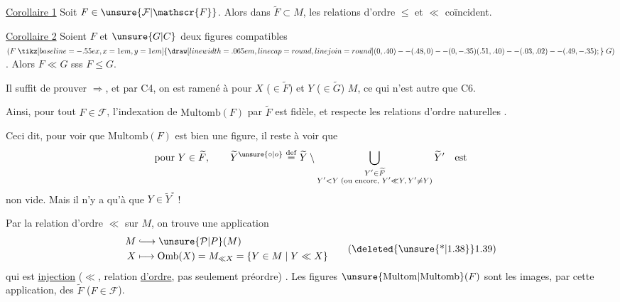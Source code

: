 
\uline{Corollaire 1} Soit $F\in\unsure{\mathcal{F}|\mathscr{F}}$. Alors dans $\widetilde F\subset M$, les relations d'ordre $\leq$ et $\ll$ coïncident.

\uline{Corollaire 2} Soient $F$ et $\unsure{G|C}$ deux figures compatibles $(F \mathrel{\tikz[baseline=-.55ex,x=1em,y=1em]{\draw[line width=.065em,line cap=round,line join=round] (0,.40)--(.48,0)--(0,-.35) (.51,.40)--(.03,.02)--(.49,-.35);}} G)$. Alors $F\ll G$ sss $F\leq G$.

Il suffit de prouver $\Longrightarrow$, et par C4, on est ramené à  pour $X$ ($\in\widetilde F$) et $Y$ ($\in\widetilde G$)  $M$, ce qui n'est autre que C6.

Ainsi, pour tout $F\in\mathcal{F}$, l'indexation de $\mathrm{Multomb}(F)$ par $\widetilde F$ est fidèle, et respecte les relations d'ordre naturelles .

Ceci  dit, pour voir que $\mathrm{Multomb}(F)$ est bien une figure, il reste à voir que
\[
 \text{pour }Y\in\widetilde F,\qquad \widetilde Y^{\unsure{\circ|o}}\overset{\mathrm{def}}{=}
 \widetilde Y\setminus
 \bigcup_{\substack{Y'\in\widetilde F\\Y'<Y\;(\text{ou encore, }Y'\ll Y,\,Y'\ne Y)}}\widetilde Y'\quad\text{est}
\]
non vide. Mais il n'y a qu'à  que $Y\in\widetilde Y^\circ$ !

Par la relation d'ordre $\ll$ sur $M$, on trouve une application
\[
 \begin{aligned}
 M&\lhook\joinrel\longrightarrow\unsure{\mathcal{P}|P}(M)\\
 X&\longmapsto\mathrm{Omb}(X)=M_{\ll X}=\{Y\in M\mid Y\ll X\}
 \end{aligned}
 \tag*{(\deleted{\unsure{*|1.38}}1.39)}
\]
qui est \uline{injection} ($\ll$, relation \uline{d'ordre}, pas seulement préordre) . Les figures $\unsure{\mathrm{Multom}|\mathrm{Multomb}}(F)$ sont les images, par cette application, des $\widetilde F$ ($F\in\mathcal{F}$). 
